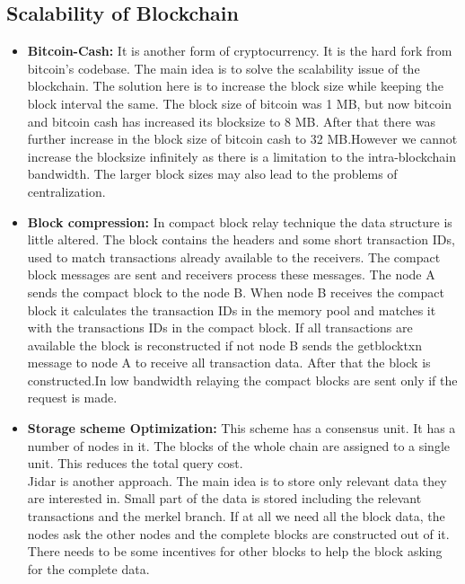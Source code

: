 \documentclass{IEEEtran}
\begin{document}
    \subsection{Scalability of Blockchain \cite{8962150}}
      \begin{itemize}
        \item \textbf{Bitcoin-Cash:} It is another form of cryptocurrency. It is the hard fork from bitcoin’s codebase. The main idea is to solve the scalability issue of the blockchain. The solution here is to increase the block size while keeping the block interval the same. The block size of bitcoin was 1 MB, but now bitcoin and bitcoin cash has increased its blocksize to 8 MB. After that there was further increase in the block size of bitcoin cash to 32 MB.However we cannot increase the blocksize infinitely as there is a limitation to the intra-blockchain bandwidth. The larger block sizes may also lead to the problems of centralization.
        \item \textbf{Block compression:} In compact block relay technique the data structure is little altered. The block contains the headers and some short transaction IDs,  used to match transactions already available to the receivers. The compact block messages are sent and receivers process these messages. The node A sends the compact block to the node B. When node B receives the compact block it calculates the transaction IDs in the memory pool and matches it with the transactions IDs in the compact block. If all transactions are available the block is reconstructed if not node B sends the getblocktxn message to node A to receive all transaction data. After that the block is constructed.In low bandwidth relaying the compact blocks are sent only if the request is made.
        \item \textbf{Storage scheme Optimization:} This scheme has a consensus unit. It has a number of nodes in it. The blocks of the whole chain are assigned to a single unit. This reduces the total query cost.\\Jidar is another approach. The main idea is to store only relevant data they are interested in. Small part of the data is stored including the relevant transactions and the merkel branch. If at all we need all the block data, the nodes ask the other nodes and the complete blocks are constructed out of it. There needs to be some incentives for other blocks to help the block asking for the complete data.
      \end{itemize}
\end{document}
